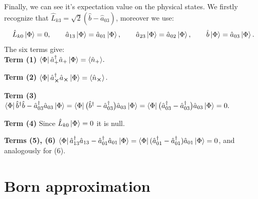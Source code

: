 \documentclass[12pt,a4paper,oneside]{article}
\numberwithin{equation}{section}   %
\begin{document}
Finally, we can see it's expectation value on 
the physical states.
We firstly recognize that $\hat L_{k3}=\sqrt2(\hat b-\hat a_{03})$, moreover we use:
\begin{equation}
\hat L_{k0}\ket{\Phi}=0,\qquad
\hat a_{13}\ket{\Phi}=\hat a_{01}\ket{\Phi},\qquad
\hat a_{23}\ket{\Phi}=\hat a_{02}\ket{\Phi},\qquad
\hat b\ket{\Phi}=\hat a_{03}\ket{\Phi}.
\end{equation}
The six terms give:\\
\noindent\textbf{Term (1)} 
$
\bra{\Phi}\hat a_+^\dagger\hat a_+\ket{\Phi}
=\langle\hat n_{+}\rangle .
$

\noindent\textbf{Term (2)} $\bra{\Phi}\hat a^\dagger_{\cross}\hat a_{\cross}\ket{\Phi}
=\langle\hat n_{\cross}\rangle$.

\noindent\textbf{Term (3)}
$
\bra{\Phi}\hat b^\dagger\hat b-\hat a^\dagger_{03}\hat a_{03}\ket{\Phi}
=\bra{\Phi}\bigl(\hat b^\dagger-\hat a^\dagger_{03}\bigr)\hat a_{03}\ket{\Phi}
=\bra{\Phi}\bigl(\hat a^\dagger_{03}-\hat a^\dagger_{03}\bigr)\hat a_{03}\ket{\Phi}=0 .
$

\noindent\textbf{Term (4)} Since $\hat L_{k0}\ket{\Phi}=0$ it is null.

\noindent\textbf{Terms (5), (6)} 
$\bra{\Phi}\hat a^\dagger_{13}\hat a_{13}-\hat a^\dagger_{01}\hat a_{01}\ket{\Phi}
=\bra{\Phi}(\hat a^\dagger_{01}-\hat a^\dagger_{01})\hat a_{01}\ket{\Phi}=0$,
and analogously for (6).

\section{Born approximation}
\end{document}
